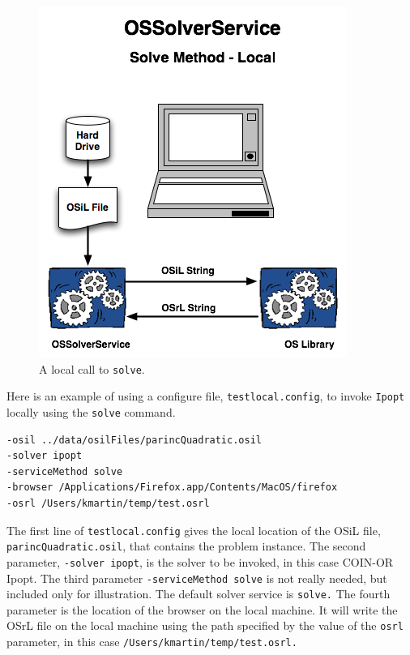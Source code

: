 \documentclass[11pt]{article}
\newcommand{\figurepath}{./figures}
\renewcommand{\_}{{\char"5F}}
\renewcommand{\{}{{\char"7B}}
\renewcommand{\}}{{\char"7D}}
\renewcommand{\^}{{\char"0D}}
\renewcommand{\'}{{\char"0D}}
\begin{document}
\begin{enumerate}[Step 1:]
\begin{figure}
\centering
\includegraphics[scale=0.5]{./figures/OSSolverServiceLocal.png}
\caption{A local call to {\tt solve}.}
\label{figure:ossolverservicelocal}
\end{figure}



Here is an example of using a configure file,  {\tt testlocal.config},
to invoke {\tt Ipopt} locally using the {\tt solve} command.

\begin{verbatim}
-osil ../data/osilFiles/parincQuadratic.osil
-solver ipopt
-serviceMethod solve
-browser /Applications/Firefox.app/Contents/MacOS/firefox
-osrl /Users/kmartin/temp/test.osrl
\end{verbatim}



The first line of {\tt testlocal.config} gives the local location
of the OSiL file,
{\tt parincQuadratic.osil}, that contains the problem instance. The second parameter,
{\tt -solver ipopt},  is the solver to be invoked, in this case COIN-OR Ipopt.
The third parameter {\tt -serviceMethod solve} is not really needed,
but included only for illustration. The default solver service is {\tt solve.}
The fourth parameter is the location of the browser on the local machine.
It will write the OSrL file on the local machine using the path specified
by the value of the {\tt osrl} parameter, in this case
{\tt /Users/kmartin/temp/test.osrl.}


\end{enumerate}
\end{document}
